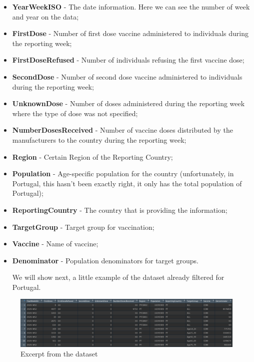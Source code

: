 \begin{itemize}
    \item \textbf{YearWeekISO} - The date information. Here we can see the number of week and year on the data;
    \item \textbf{FirstDose} - Number of first dose vaccine administered to individuals during the reporting week;
    \item \textbf{FirstDoseRefused} - Number of individuals refusing the first vaccine dose;
    \item \textbf{SecondDose} - Number of second dose vaccine administered to individuals during the reporting week;
    \item \textbf{UnknownDose} - Number of doses administered during the reporting week where the type of dose was not specified;
    \item \textbf{NumberDosesReceived} - Number of vaccine doses distributed by the manufacturers to the country during the reporting week;
    \item \textbf{Region} - Certain Region of the Reporting Country;
    \item \textbf{Population} - Age-specific population for the country (unfortunately, in Portugal, this hasn't been exactly right, it only has the total population of Portugal);
    \item \textbf{ReportingCountry} - The country that is providing the information;
    \item \textbf{TargetGroup} - Target group for vaccination;
    \item \textbf{Vaccine} - Name of vaccine;
    \item \textbf{Denominator} - Population denominators for target groups.

We will show next, a little example of the dataset already filtered for Portugal.

\end{itemize}

\begin{figure}[h]
\centering %
\includegraphics[width=15cm]{images/dataset.png} 

\caption{Excerpt from the dataset }
\label{figura:qualquernome}
\end{figure}

